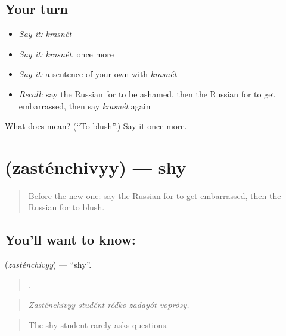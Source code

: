 \subsection*{Your turn}
\begin{itemize}
\raggedright
  \item \emph{Say it:} \emph{krasnét}
  \item \emph{Say it:} \emph{krasnét}, once more
  \item \emph{Say it:} a sentence of your own with \emph{krasnét}
  \item \emph{Recall:} say the Russian for to be ashamed, then the Russian for to get embarrassed, then say \emph{krasnét} again
\end{itemize}

\begin{tcolorbox}[breakable,colback=teal!4,colframe=teal!35!black,title={Before you move on}]
What does  mean? (\textquotedblleft{}To blush\textquotedblright{}.) Say it once more.
\end{tcolorbox}
\section[\texorpdfstring{\ru{застенчивый} (zasténchivyy)}{застенчивый (zasténchivyy)}]{ (zasténchivyy) — shy}

\label{lesson:RU-C470-zastenchivyy}



\begin{quote}
Before the new one: say the Russian for to get embarrassed, then the Russian for to blush.
\end{quote}

\subsection*{You'll want to know: }
\textbf{} (\emph{zasténchivyy}) — \textquotedblleft{}shy\textquotedblright{}.

\begin{quote}
    .
\end{quote}

\begin{quote}
\emph{Zasténchivyy studént rédko zadayót voprósy.}
\end{quote}

\begin{quote}
The shy student rarely asks questions.
\end{quote}

